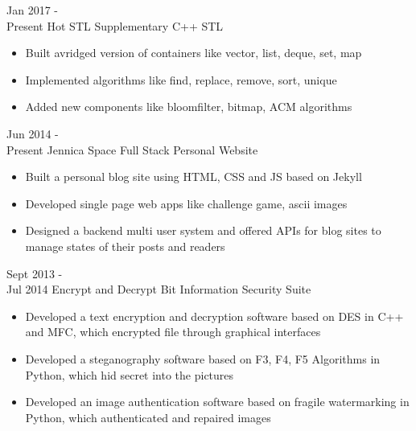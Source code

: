 \documentclass[letterpaper]{twentysecondcv} %
\begin{document}
\begin{twenty} %
	\twentyitem
	{Jan 2017 - \\Present}
	{Hot STL}
	{Supplementary C++ STL}
	{}
	{
		{\begin{itemize}
				\item Built avridged version of containers like vector, list, deque, set, map
				\item Implemented algorithms like find, replace, remove, sort, unique
				\item Added new components like bloomfilter, bitmap, ACM algorithms
		\end{itemize}}
	}

	\twentyitem
	{Jun 2014 - \\Present}
	{Jennica Space}
	{Full Stack Personal Website}
	{}
	{
		{\begin{itemize}
				\item Built a personal blog site using HTML, CSS and JS based on Jekyll
				\item Developed single page web apps like challenge game, ascii images
				\item Designed a backend multi user system and offered APIs for blog sites to manage states of their posts and readers
		\end{itemize}}
	}

	\twentyitem
	{Sept 2013 - \\Jul 2014}
	{Encrypt and Decrypt Bit}
	{Information Security Suite}
	{}
	{
		{\begin{itemize}
				\item Developed a text encryption and decryption software based on DES in C++ and MFC, which encrypted file through graphical interfaces
				\item Developed a steganography software based on F3, F4, F5 Algorithms in Python, which hid secret into the pictures
				\item Developed an image authentication software based on fragile watermarking in Python, which authenticated and repaired images
		\end{itemize}}
	}
	
\end{twenty}


\end{document}
